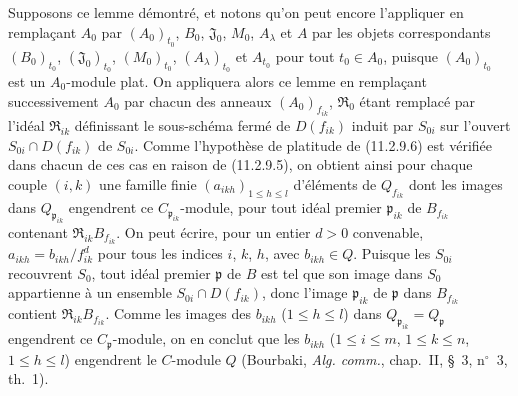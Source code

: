 Supposons ce lemme démontré, et notons qu'on peut encore l'appliquer en
remplaçant $A_0$ par $(A_0)_{t_0}$, $B_0$, $\mathfrak J_0$, $M_0$,
$A_\lambda$ et $A$ par les objets correspondants $(B_0)_{t_0}$,
$(\mathfrak J_0)_{t_0}$, $(M_0)_{t_0}$, $(A_\lambda)_{t_0}$ et $A_{t_0}$ pour
tout $t_0\in A_0$, puisque $(A_0)_{t_0}$ est un $A_0$-module plat. On
appliquera alors ce lemme en remplaçant successivement $A_0$ par chacun des
anneaux $(A_0)_{f_{ik}}$, $\mathfrak R_0$ étant remplacé par l'idéal
$\mathfrak R_{ik}$ définissant le sous-schéma fermé de $D(f_{ik})$ induit par
$S_{0i}$ sur l'ouvert $S_{0i}\cap D(f_{ik})$ de $S_{0i}$. Comme l'hypothèse
de platitude de (11.2.9.6) est vérifiée dans chacun de ces cas en raison de
(11.2.9.5), on obtient ainsi pour chaque couple $(i,k)$ une famille finie
$(a_{ikh})_{1\leq h\leq l}$ d'éléments de $Q_{f_{ik}}$ dont les images dans
$Q_{\mathfrak p_{ik}}$ engendrent ce $C_{\mathfrak p_{ik}}$-module, pour tout
idéal premier $\mathfrak p_{ik}$ de $B_{f_{ik}}$ contenant
$\mathfrak R_{ik}B_{f_{ik}}$. On peut écrire, pour un entier $d>0$ convenable,
$a_{ikh}=b_{ikh}/f_{ik}^d$ pour tous les indices $i$, $k$, $h$, avec
$b_{ikh}\in Q$. Puisque les $S_{0i}$ recouvrent $S_0$, tout idéal premier
$\mathfrak p$ de $B$ est tel que son image dans $S_0$ appartienne à un
ensemble $S_{0i}\cap D(f_{ik})$, donc l'image $\mathfrak p_{ik}$ de
$\mathfrak p$ dans $B_{f_{ik}}$ contient $\mathfrak R_{ik}B_{f_{ik}}$. Comme
les images des $b_{ikh}$ ($1\leq h\leq l$) dans
$Q_{\mathfrak p_{ik}}=Q_\mathfrak p$ engendrent ce $C_\mathfrak p$-module,
on en conclut que les $b_{ikh}$
($1\leq i\leq m$, $1\leq k\leq n$, $1\leq h\leq l$) engendrent le
$C$-module $Q$ (Bourbaki, \emph{Alg. comm.}, chap.~II, \S~3, n$^\circ$~3,
th.~1).

